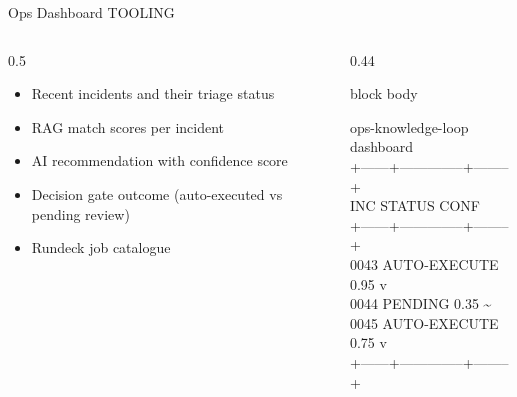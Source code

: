 \documentclass[aspectratio=169,10pt]{beamer}
\newcommand{\slidecat}[1]{{\color{cdim}\ttfamily\scriptsize\MakeUppercase{#1}}}
\newenvironment{terminal}{%
  \begin{beamercolorbox}[sep=6pt,rounded=true,shadow=false]{block body}%
  \ttfamily\tiny\color{cterm}%
}{%
  \end{beamercolorbox}%
}
\begin{document}
\begin{frame}{Ops Dashboard}
  \slidecat{Tooling}
  \vspace{0.2cm}
  \begin{columns}[T]
    \begin{column}{0.5\textwidth}
      \begin{itemize}\itemsep3pt
        \item Recent incidents and their triage status
        \item RAG match scores per incident
        \item AI recommendation with confidence score
        \item Decision gate outcome (auto-executed vs pending review)
        \item Rundeck job catalogue
      \end{itemize}
      \vspace{0.2cm}
    \end{column}
    \begin{column}{0.44\textwidth}
      \begin{terminal}
ops-knowledge-loop dashboard\\
+------+--------------+--------+\\
\textbar{} INC  \textbar{} STATUS       \textbar{} CONF   \textbar{}\\
+------+--------------+--------+\\
\textbar{} 0043 \textbar{} AUTO-EXECUTE \textbar{} 0.95 v \textbar{}\\
\textbar{} 0044 \textbar{} PENDING      \textbar{} 0.35 \textasciitilde{} \textbar{}\\
\textbar{} 0045 \textbar{} AUTO-EXECUTE \textbar{} 0.75 v \textbar{}\\
+------+--------------+--------+\\
      \end{terminal}
    \end{column}
  \end{columns}
\end{frame}
\end{document}
